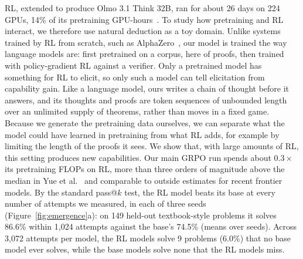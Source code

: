 RL, extended to produce Olmo 3.1 Think 32B, ran for about 26 days on 224 GPUs, 14\% of its pretraining GPU-hours~\cite{olmoOlmo32025}.
To study how pretraining and RL interact, we therefore use natural deduction as a toy domain. Unlike systems trained
by RL from scratch, such as AlphaZero~\cite{Silver_2018}, our model is trained the way language models are: first
pretrained on a corpus, here of proofs, then trained with policy-gradient RL against a verifier. Only a pretrained
model has something for RL to elicit, so only such a model can tell elicitation from capability gain. Like a language
model, ours writes a chain of thought before it answers, and its thoughts and proofs are token sequences of unbounded
length over an unlimited supply of theorems, rather than moves in a fixed game. Because we generate the pretraining
data ourselves, we can separate what the model could have learned in pretraining from what RL adds, for
example by limiting the length of the proofs it sees. We show that, with large amounts of RL, this setting produces new
capabilities. Our main GRPO run spends about $0.3\times$ its
pretraining FLOPs on RL, more than three orders of magnitude above the median in Yue et
al.~\cite{yueDoesReinforcementLearning2025} and comparable to outside estimates for recent frontier models. By the
standard pass@$k$ test, the RL model beats its base at every number of attempts we measured, in each of three
seeds (Figure~\ref{fig:emergence}a): on 149 held-out textbook-style problems it solves 86.6\% within 1,024 attempts against the base's 74.5\%
(means over seeds). Across 3,072 attempts per model, the RL models solve 9 problems (6.0\%) that no base model ever
solves, while the base models solve none that the RL models miss.

